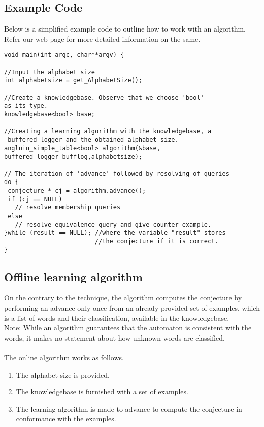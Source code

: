 \subsection{Example Code}
Below is a simplified example code to outline how to work with an \online algorithm. Refer our web page for more detailed information on the same. 
\lstset{language=c++, numbers=left, numberstyle=\tiny, stepnumber=1, numbersep=5pt}
\begin{lstlisting}[frame=single]
void main(int argc, char**argv) {

//Input the alphabet size
int alphabetsize = get_AlphabetSize();

//Create a knowledgebase. Observe that we choose 'bool' 
as its type.
knowledgebase<bool> base;

//Creating a learning algorithm with the knowledgebase, a
 buffered logger and the obtained alphabet size.
angluin_simple_table<bool> algorithm(&base,
buffered_logger bufflog,alphabetsize);

// The iteration of 'advance' followed by resolving of queries
do {
 conjecture * cj = algorithm.advance();
 if (cj == NULL) 
   // resolve membership queries
 else 
   // resolve equivalence query and give counter example.
}while (result == NULL); //where the variable "result" stores 
                         //the conjecture if it is correct.
}
\end{lstlisting}

\subsection{Offline learning algorithm}
On the contrary to the \online technique, the \offline algorithm computes the conjecture by performing an advance only once from an already provided set of examples, which is a list of words and their classification, available in the knowledgebase. \\
Note: While an \offline algorithm guarantees that the automaton is consistent with the words, it makes no statement about how unknown words are classified. 
\paragraph{}
The online algorithm works as follows.
\begin{enumerate}
 \item The alphabet size is provided.
 \item The knowledgebase is furnished with a set of examples.
 \item The learning algorithm is made to advance to compute the conjecture in conformance with the examples.
\end{enumerate}
